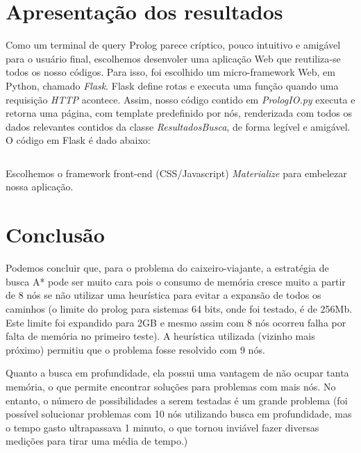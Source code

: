 \documentclass[12pt,a4paper]{article}
\begin{document}
  \section{Apresentação dos resultados}
  Como um terminal de query Prolog parece críptico, pouco intuitivo e amigável para o usuário final, escolhemos desenvoler uma aplicação Web que reutiliza-se todos os nosso códigos. Para isso, foi escolhido um micro-framework Web, em Python, chamado \emph{Flask}. Flask define rotas e executa uma função quando uma requisição \emph{HTTP} acontece. Assim, nosso código contido em \emph{PrologIO.py} executa e retorna uma página, com template predefinido por nós, renderizada com todos os dados relevantes contidos da classe \emph{ResultadosBusca}, de forma legível e amigável. O código em Flask é dado abaixo:
  \begin{mdframed}[linecolor=black, topline=true, bottomline=true,leftline=false, rightline=false, backgroundcolor=yellow!10!white]
\inputminted[tabsize=2,linenos=true,fontsize=\footnotesize,breaklines=true,breakafter=format]{python}{../tspserver.py}
\end{mdframed}

Escolhemos o framework front-end (CSS/Javascript) \emph{Materialize} para embelezar nossa aplicação.
\section{Conclusão}
	Podemos concluir que, para o problema do caixeiro-viajante, a estratégia de busca A* pode ser muito cara pois o consumo de memória cresce muito a partir de 8 nós se não utilizar uma heurística para evitar a expansão de todos os caminhos (o limite do prolog para sistemas 64 bits, onde foi testado, é de 256Mb. Este limite foi expandido para 2GB e mesmo assim com 8 nós ocorreu falha por falta de memória no primeiro teste). A heurística utilizada (vizinho mais próximo) permitiu que o problema fosse resolvido com 9 nós.

	Quanto a busca em profundidade, ela possui uma vantagem de não ocupar tanta memória, o que permite encontrar soluções para problemas com mais nós. No entanto, o número de possibilidades a serem testadas é um grande problema (foi possível solucionar problemas com 10 nós utilizando busca em profundidade, mas o tempo gasto ultrapassava 1 minuto, o que tornou inviável fazer diversas medições para tirar uma média de tempo.)
\end{document}
